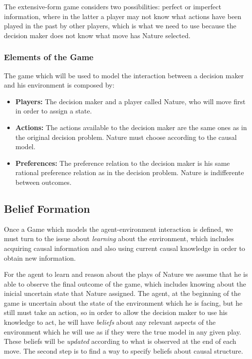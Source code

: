 \documentclass[english,letterpaper,12pt,final]{article}
\theoremstyle{definition}
\begin{document}
The extensive-form game considers two possibilities: perfect or imperfect information, where in the latter a player may not know what actions have been played in the past by other players, which is what we need to use because the decision maker does not know what move has Nature selected. 
\subsubsection{Elements of the Game}
The game which will be used to model the interaction between a decision maker and his environment is composed by:
\begin{itemize}
\item \textbf{Players:} The decision maker and a player called Nature, who will move first in order to assign a state.
\item \textbf{Actions:} The actions available to the decision maker are the same ones as in the original decision problem. Nature must choose according to the causal model.
\item \textbf{Preferences:} The preference relation to the decision maker is his same rational preference relation as in the decision problem. Nature is indifferente between outcomes.
\end{itemize}

\subsection{Belief Formation}
Once a Game which models the agent-environment interaction is defined, we must turn to the issue about \textit{learning} about the environment, which includes acquiring causal information and also using current causal knowledge in order to obtain new information.

For the agent to learn and reason about the plays of Nature we assume that he is able to observe the final outcome of the game, which includes knowing about the inicial uncertain state that Nature assigned. The agent, at the beginning of the game is uncertain about the state of the environment which he is facing, but he still must take an action, so in order to allow the decision maker to use his knowledge to act, he will have \textit{beliefs} about any relevant aspects of the environment which he will use as if they were the true model in any given play. These beliefs will be \textit{updated} according to what is observed at the end of each move. The second step is to find a way to specify beliefs about causal structure.
\end{document}
